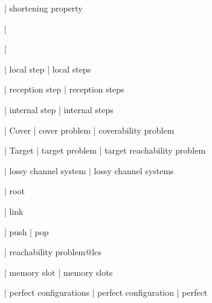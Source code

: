 | shortening property

| \memoryproj

| \memoryproj

| local step
| local steps

| reception step
| reception steps

| internal step
| internal steps


| Cover
| cover problem
| coverability problem

| Target
| target problem
| target reachability problem


| lossy channel system
| lossy channel systems

| root

| link

| push
| pop

| reachability problem@lcs


| memory slot
| memory slots

| perfect configurations
| perfect configuration
| perfect
